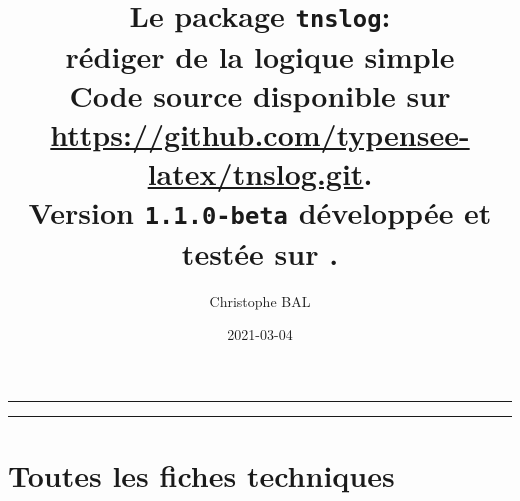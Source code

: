 \documentclass[12pt,a4paper]{article}
\begin{document}
\renewcommand\labelitemi{\raisebox{0.125em}{\tiny\textbullet}}
\renewcommand{\labelitemii}{---}

\title{  %
	Le package \texttt{tnslog}:\\%
	rédiger de la logique simple\\%
	{\footnotesize Code source disponible sur \url{https://github.com/typensee-latex/tnslog.git}.}\\%
{\footnotesize Version \texttt{1.1.0-beta} développée et testée sur \macosxname{}.}%
}
\author{Christophe BAL}
\date{2021-03-04}

\maketitle


\vspace{2em}

\hrule

\tableofcontents

\vspace{1.5em}

\hrule

\newpage



\newpage
\section{Toutes les fiches techniques} \label{techincal-ids}

\end{document}
